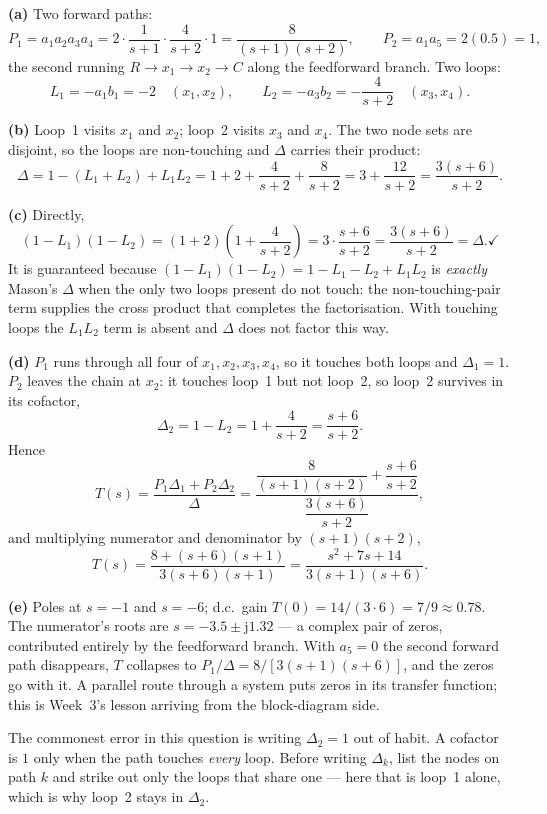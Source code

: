 \documentclass[11pt,a4paper]{article}
\begin{document}
\begin{solution}
\textbf{(a)} Two forward paths:
\[
  P_1 = a_1a_2a_3a_4 = 2\cdot\frac{1}{s+1}\cdot\frac{4}{s+2}\cdot 1
      = \frac{8}{(s+1)(s+2)},
  \qquad
  P_2 = a_1a_5 = 2(0.5) = 1 ,
\]
the second running $R\to x_1\to x_2\to C$ along the feedforward branch. Two
loops:
\[
  L_1 = -a_1b_1 = -2 \quad (x_1,x_2),
  \qquad
  L_2 = -a_3b_2 = -\frac{4}{s+2} \quad (x_3,x_4).
\]

\medskip
\textbf{(b)} Loop~1 visits $x_1$ and $x_2$; loop~2 visits $x_3$ and $x_4$. The
two node sets are disjoint, so the loops are non-touching and $\Delta$ carries
their product:
\[
  \Delta = 1-(L_1+L_2)+L_1L_2
   = 1+2+\frac{4}{s+2}+\frac{8}{s+2}
   = 3+\frac{12}{s+2}
   = \frac{3(s+6)}{s+2} .
\]

\medskip
\textbf{(c)} Directly,
\[
  (1-L_1)(1-L_2) = (1+2)\left(1+\frac{4}{s+2}\right)
   = 3\cdot\frac{s+6}{s+2} = \frac{3(s+6)}{s+2} = \Delta . \checkmark
\]
It is guaranteed because $(1-L_1)(1-L_2)=1-L_1-L_2+L_1L_2$ is \emph{exactly}
Mason's $\Delta$ when the only two loops present do not touch: the
non-touching-pair term supplies the cross product that completes the
factorisation. With touching loops the $L_1L_2$ term is absent and $\Delta$
does not factor this way.

\medskip
\textbf{(d)} $P_1$ runs through all four of $x_1,x_2,x_3,x_4$, so it touches
both loops and $\Delta_1=1$. $P_2$ leaves the chain at $x_2$: it touches
loop~1 but not loop~2, so loop~2 survives in its cofactor,
\[
  \Delta_2 = 1-L_2 = 1+\frac{4}{s+2}=\frac{s+6}{s+2} .
\]
Hence
\[
  T(s)=\frac{P_1\Delta_1+P_2\Delta_2}{\Delta}
   =\frac{\dfrac{8}{(s+1)(s+2)}+\dfrac{s+6}{s+2}}{\dfrac{3(s+6)}{s+2}} ,
\]
and multiplying numerator and denominator by $(s+1)(s+2)$,
\[
  T(s)=\frac{8+(s+6)(s+1)}{3(s+6)(s+1)}
   =\frac{s^{2}+7s+14}{3(s+1)(s+6)} .
\]

\medskip
\textbf{(e)} Poles at $s=-1$ and $s=-6$; d.c.\ gain
$T(0)=14/(3\cdot 6)=7/9\approx0.78$. The numerator's roots are
$s=-3.5\pm\mathrm{j}1.32$ --- a complex pair of zeros, contributed entirely by
the feedforward branch. With $a_5=0$ the second forward path disappears,
$T$ collapses to $P_1/\Delta = 8/[3(s+1)(s+6)]$, and the zeros go with it.
A parallel route through a system puts zeros in its transfer function; this is
Week~3's lesson arriving from the block-diagram side.
\end{solution}

\begin{pitfall}
The commonest error in this question is writing $\Delta_2=1$ out of habit. A
cofactor is $1$ only when the path touches \emph{every} loop. Before writing
$\Delta_k$, list the nodes on path $k$ and strike out only the loops that share
one --- here that is loop~1 alone, which is why loop~2 stays in $\Delta_2$.
\end{pitfall}
\end{document}
